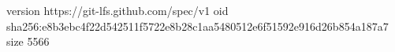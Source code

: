 version https://git-lfs.github.com/spec/v1
oid sha256:e8b3ebc4f22d542511f5722e8b28c1aa5480512e6f51592e916d26b854a187a7
size 5566
